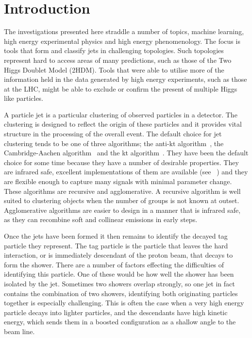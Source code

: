 \section{Introduction}
The investigations presented here straddle a number of topics, machine learning, high energy experimental physics and high energy phenomenology. 
The focus is tools that form and classify jets in challenging topologies.
Such topologies represent hard to access areas of many predictions, such as those of the Two Higgs Doublet Model (2HDM).
Tools that were able to utilise more of the information held in the data generated by high energy experiments, such as those at the LHC,
might be able to exclude or confirm the present of multiple Higgs like particles.

A particle jet is a particular clustering of observed particles in a detector.
The clustering is designed to reflect the origin of these particles and it provides vital structure in the processing of the overall event.
The default choice for jet clustering tends to be one of three algorithms;
the anti-kt algorithm~\cite{Cacciari2008akt}, the Cambridge-Aachen algorithm~\cite{Wobisch1998caJet} and the kt algorithm~\cite{Ellis1993ktJet}.
They have been the default choice for some time because they have a number of desirable properties.
They are infrared safe, excellent implementations of them are available (see \fastjet{}~\cite{Cacciari2011FastJet})
and they are flexible enough to capture many signals with minimal parameter change.
These algorithms are recursive and agglomerative.
A recursive algorithm is well suited to clustering objects when the number of groups is not known at outset.
Agglomerative algorithms are easier to design in a manner that is infrared safe,
as they can recombine soft and collinear emissions in early steps.

Once the jets have been formed it then remains to identify the decayed tag particle they represent.
The tag particle is the particle that leaves the hard interaction, or is immediately descendant of the proton beam,
that decays to form the shower.
There are a number of factors effecting the difficulties of identifying this particle.
One of these would be how well the shower has been isolated by the jet.
Sometimes two showers overlap strongly, so one jet in fact contains the combination of two showers,
identifying both originating particles together is especially challenging.
This is often the case when a very high energy particle decays into lighter particles,
and the descendants have high kinetic energy, which sends them in a boosted configuration as a shallow angle to the beam line.


